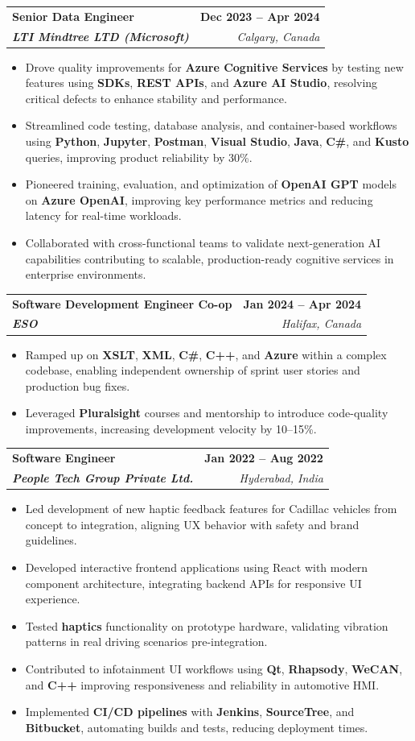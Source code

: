 \documentclass[letterpaper,11pt]{article}
\makeatletter
\newcommand{\resumeItem}[1]{
  \item\small{
    {#1 \vspace{-2pt}}
  }
}
\newcommand{\resumeSubheading}[4]{
  \vspace{-2pt}\item
    \begin{tabular*}{1.0\textwidth}[t]{l@{\extracolsep{\fill}}r}
      \textbf{#1} & \textbf{\small #2} \\
      \textit{\small#3} & \textit{\small #4} \\
    \end{tabular*}\vspace{-7pt}
}
\newcommand{\resumeItemListStart}{\begin{itemize}}
\newcommand{\resumeItemListEnd}{\end{itemize}\vspace{-5pt}}
\makeatother
\begin{document}
    \resumeSubheading
      {\textbf{Senior Data Engineer}}{\textbf{Dec 2023 -- Apr 2024}}
      {\textbf{LTI Mindtree LTD (Microsoft)}}{Calgary, Canada}
      \resumeItemListStart
        \resumeItem{Drove quality improvements for \textbf{Azure Cognitive Services} by testing new features using \textbf{SDKs}, \textbf{REST APIs}, and \textbf{Azure AI Studio}, resolving critical defects to enhance stability and performance.}
        \resumeItem{Streamlined code testing, database analysis, and container-based workflows using \textbf{Python}, \textbf{Jupyter}, \textbf{Postman}, \textbf{Visual Studio}, \textbf{Java}, \textbf{C\#}, and \textbf{Kusto} queries, improving product reliability by 30\%.}
        \resumeItem{Pioneered training, evaluation, and optimization of \textbf{OpenAI GPT} models on \textbf{Azure OpenAI}, improving key performance metrics and reducing latency for real-time workloads.}
        \resumeItem{Collaborated with cross-functional teams to validate next-generation AI capabilities contributing to scalable, production-ready cognitive services in enterprise environments.}
      \resumeItemListEnd
    
    \resumeSubheading
      {\textbf{Software Development Engineer Co-op}}{\textbf{Jan 2024 -- Apr 2024}}
      {\textbf{ESO}}{Halifax, Canada}
      \resumeItemListStart
        \resumeItem{Ramped up on \textbf{XSLT}, \textbf{XML}, \textbf{C\#}, \textbf{C++}, and \textbf{Azure} within a complex codebase, enabling independent ownership of sprint user stories and production bug fixes.}
        \resumeItem{Leveraged \textbf{Pluralsight} courses and mentorship to introduce code-quality improvements, increasing development velocity by 10--15\%.}
      \resumeItemListEnd

    \resumeSubheading
      {\textbf{Software Engineer}}{\textbf{Jan 2022 -- Aug 2022}}
      {\textbf{People Tech Group Private Ltd.}}{Hyderabad, India}
      \resumeItemListStart
        \resumeItem{Led development of new haptic feedback features for Cadillac vehicles from concept to integration, aligning UX behavior with safety and brand guidelines.}
        \resumeItem{Developed interactive frontend applications using React with modern component architecture, integrating backend APIs for responsive UI experience.}
        \resumeItem{Tested \textbf{haptics} functionality on prototype hardware, validating vibration patterns in real driving scenarios pre-integration.}
        \resumeItem{Contributed to infotainment UI workflows using \textbf{Qt}, \textbf{Rhapsody}, \textbf{WeCAN}, and \textbf{C++} improving responsiveness and reliability in automotive HMI.}
        \resumeItem{Implemented \textbf{CI/CD pipelines} with \textbf{Jenkins}, \textbf{SourceTree}, and \textbf{Bitbucket}, automating builds and tests, reducing deployment times.}
      \resumeItemListEnd
\end{document}
